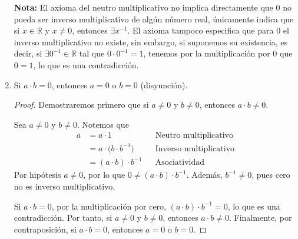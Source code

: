 \documentclass[11pt]{article}
\newcommand{\R}{\mathbb{R}}
\begin{document}
\begin{enumerate}[label=\alph*)]
    \textbf{Nota:} El axioma del neutro multiplicativo no implica directamente que $0$ no pueda ser inverso multiplicativo de algún número real, únicamente indica que si $x\in \R$ y $x\neq 0$, entonces $\exists x^{-1}$. El axioma tampoco especifica que para $0$ el inverso multiplicativo no existe, sin embargo, si suponemos su existencia, es decir, si $\exists 0^{-1}\in \R$ tal que $0\cdot 0^{-1}=1$, tenemos por la multiplicación por $0$ que $0=1$, lo que es una contradicción.

    \item Si $ a \cdot b = 0 $, entonces $a=0$ o $b=0$ (disyunción).
    \vspace{-1em}
    \begin{proof} Demostraremos primero que si $a\neq 0$ y $b\neq 0$, entonces $a\cdot b\neq 0$.
    
    Sea $a\neq 0$ y $b\neq 0$. Notemos que \vspace{1em}\begin{align*}
        a &= a\cdot 1 && \text{Neutro multiplicativo}\\
        &= a\cdot \bigl(b\cdot b^{-1}\bigr) && \text{Inverso multiplicativo}\\
        &= (a\cdot b) \cdot b^{-1} && \text{Asociatividad}
    \end{align*}
    Por hipótesis $a\neq 0$, por lo que $0\neq (a\cdot b) \cdot b^{-1}$. Además, $b^{-1}\neq 0$, pues cero no es inverso multiplicativo.
    
    Si $a\cdot b=0$, por la multiplicación por cero, $(a\cdot b) \cdot b^{-1}=0$, lo que es una contradicción. Por tanto, si $a\neq 0$ y $b\neq 0$, entonces $a\cdot b\neq 0$. Finalmente, por contraposición, si $a\cdot b =0$, entonces $a=0$ o $b=0$.
    \end{proof} \vspace{-1em}


\end{enumerate}
\end{document}
